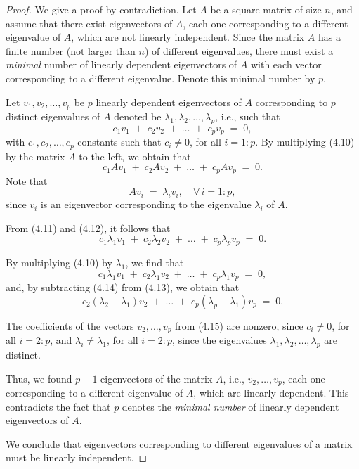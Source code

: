 \begin{proof}
We give a proof by contradiction. Let $A$ be a square matrix of size $n$, and assume
that there exist eigenvectors of $A$, each one corresponding to a different eigenvalue
of $A$, which are not linearly independent. Since the matrix $A$ has a finite number
(not larger than $n$) of different eigenvalues, there must exist a \emph{minimal}
number of linearly dependent eigenvectors of $A$ with each vector corresponding to a
different eigenvalue. Denote this minimal number by $p$.

Let $v_1, v_2, \dots, v_p$ be $p$ linearly dependent eigenvectors of $A$ corresponding
to $p$ distinct eigenvalues of $A$ denoted be $\lambda_1, \lambda_2, \dots, \lambda_p$,
i.e., such that
\begin{equation}
c_1 v_1 \;+\; c_2 v_2 \;+\; \dots \;+\; c_p v_p \;=\; 0,
\end{equation}
with $c_1, c_2, \dots, c_p$ constants such that $c_i \neq 0$, for all $i = 1:p$. By
multiplying (4.10) by the matrix $A$ to the left, we obtain that
\begin{equation}
c_1 A v_1 \;+\; c_2 A v_2 \;+\; \dots \;+\; c_p A v_p \;=\; 0.
\end{equation}
Note that
\begin{equation}
A v_i \;=\; \lambda_i v_i, \quad \forall\, i = 1:p,
\end{equation}
since $v_i$ is an eigenvector corresponding to the eigenvalue $\lambda_i$ of $A$.

From (4.11) and (4.12), it follows that
\begin{equation}
c_1 \lambda_1 v_1 \;+\; c_2 \lambda_2 v_2 \;+\; \dots \;+\; c_p \lambda_p v_p \;=\; 0.
\end{equation}

By multiplying (4.10) by $\lambda_1$, we find that
\begin{equation}
c_1 \lambda_1 v_1 \;+\; c_2 \lambda_1 v_2 \;+\; \dots \;+\; c_p \lambda_1 v_p \;=\; 0,
\end{equation}
and, by subtracting (4.14) from (4.13), we obtain that
\begin{equation}
c_2(\lambda_2-\lambda_1) v_2 \;+\; \dots \;+\; c_p(\lambda_p-\lambda_1) v_p \;=\; 0.
\end{equation}

The coefficients of the vectors $v_2, \dots, v_p$ from (4.15) are nonzero, since
$c_i \neq 0$, for all $i = 2:p$, and $\lambda_i \neq \lambda_1$, for all $i = 2:p$,
since the eigenvalues $\lambda_1, \lambda_2, \dots, \lambda_p$ are distinct.

Thus, we found $p-1$ eigenvectors of the matrix $A$, i.e., $v_2, \dots, v_p$, each one
corresponding to a different eigenvalue of $A$, which are linearly dependent. This
contradicts the fact that $p$ denotes the \emph{minimal number} of linearly dependent
eigenvectors of $A$.

We conclude that eigenvectors corresponding to different eigenvalues of a matrix must
be linearly independent.
\end{proof}

